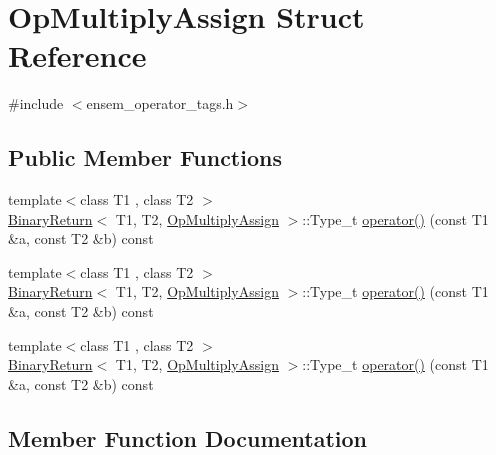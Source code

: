 \hypertarget{structOpMultiplyAssign}{}\section{Op\+Multiply\+Assign Struct Reference}
\label{structOpMultiplyAssign}


{\ttfamily \#include $<$ensem\+\_\+operator\+\_\+tags.\+h$>$}

\subsection*{Public Member Functions}
\begin{DoxyCompactItemize}
\item 
{\footnotesize template$<$class T1 , class T2 $>$ }\\\mbox{\hyperlink{structBinaryReturn}{Binary\+Return}}$<$ T1, T2, \mbox{\hyperlink{structOpMultiplyAssign}{Op\+Multiply\+Assign}} $>$\+::Type\+\_\+t \mbox{\hyperlink{structOpMultiplyAssign_a2b6f7db01199e1f98d9c495d9f3275bb}{operator()}} (const T1 \&a, const T2 \&b) const
\item 
{\footnotesize template$<$class T1 , class T2 $>$ }\\\mbox{\hyperlink{structBinaryReturn}{Binary\+Return}}$<$ T1, T2, \mbox{\hyperlink{structOpMultiplyAssign}{Op\+Multiply\+Assign}} $>$\+::Type\+\_\+t \mbox{\hyperlink{structOpMultiplyAssign_a2b6f7db01199e1f98d9c495d9f3275bb}{operator()}} (const T1 \&a, const T2 \&b) const
\item 
{\footnotesize template$<$class T1 , class T2 $>$ }\\\mbox{\hyperlink{structBinaryReturn}{Binary\+Return}}$<$ T1, T2, \mbox{\hyperlink{structOpMultiplyAssign}{Op\+Multiply\+Assign}} $>$\+::Type\+\_\+t \mbox{\hyperlink{structOpMultiplyAssign_a2b6f7db01199e1f98d9c495d9f3275bb}{operator()}} (const T1 \&a, const T2 \&b) const
\end{DoxyCompactItemize}


\subsection{Member Function Documentation}
\mbox{\label{structOpMultiplyAssign_a2b6f7db01199e1f98d9c495d9f3275bb}} 
